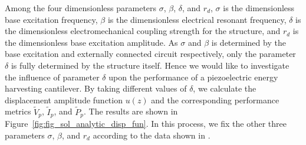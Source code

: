 \documentclass{article}
\begin{document}



Among the four dimensionless parameters $\sigma$, $\beta$, $\delta$, and $r_d$, $\sigma$ is the dimensionless base excitation frequency, $\beta$ is the dimensionless electrical resonant frequency, $\delta$ is the dimensionless electromechanical coupling strength for the structure, and $r_d$ is the dimensionless base excitation amplitude. As $\sigma$ and $\beta$ is determined by the base excitation and externally connected circuit respectively, only the parameter $\delta$ is fully determined by the structure itself. Hence we would like to investigate the influence of parameter $\delta$ upon the performance of a piezoelectric energy harvesting cantilever. By taking different values of $\delta$, we calculate the displacement amplitude function $u(z)$ and the corresponding performance metrics $\tilde{V}_p$, $\tilde{I}_p$, and $\tilde{P}_p$. The results are shown in Figure~\ref{fig:fig_sol_analytic_disp_fun}. In this process, we fix the other three parameters $\sigma$, $\beta$, and $r_d$ according to the data shown in \cite{erturk2008distributed,erturk2009experimentally}.
\end{document}
